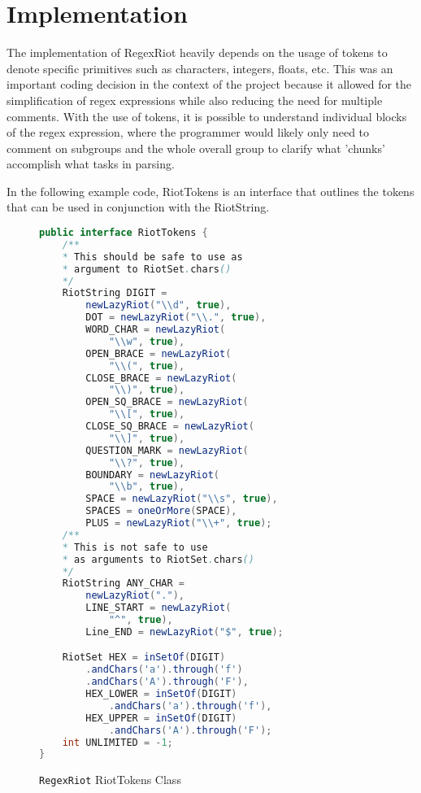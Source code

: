 \documentclass[conference]{IEEEtran}
\begin{document}
\section{Implementation}
The implementation of RegexRiot heavily depends on the usage of tokens to denote specific
primitives such as characters, integers, floats, etc. This was an important coding decision
in the context of the project because it allowed for the simplification of regex expressions
while also reducing the need for multiple comments. With the use of tokens, it is possible to
understand individual blocks of the regex expression, where the programmer would likely only
need to comment on subgroups and the whole overall group to clarify what 'chunks' accomplish
what tasks in parsing.

In the following example code, RiotTokens is an interface that outlines the tokens that can
be used in conjunction with the RiotString.

\begin{figure}[htbp]
    \centering
    \label{fig:regexriot-riot-tokens}
    \begin{lstlisting}[language=Java]
public interface RiotTokens {
    /**
    * This should be safe to use as 
    * argument to RiotSet.chars()
    */
    RiotString DIGIT = 
        newLazyRiot("\\d", true),
        DOT = newLazyRiot("\\.", true),
        WORD_CHAR = newLazyRiot(
            "\\w", true),
        OPEN_BRACE = newLazyRiot(
            "\\(", true),
        CLOSE_BRACE = newLazyRiot(
            "\\)", true),
        OPEN_SQ_BRACE = newLazyRiot(
            "\\[", true),
        CLOSE_SQ_BRACE = newLazyRiot(
            "\\]", true),
        QUESTION_MARK = newLazyRiot(
            "\\?", true),
        BOUNDARY = newLazyRiot(
            "\\b", true),
        SPACE = newLazyRiot("\\s", true),
        SPACES = oneOrMore(SPACE),
        PLUS = newLazyRiot("\\+", true);
    /**
    * This is not safe to use
    * as arguments to RiotSet.chars()
    */
    RiotString ANY_CHAR = 
        newLazyRiot("."),
        LINE_START = newLazyRiot(
            "^", true),
        Line_END = newLazyRiot("$", true);

    RiotSet HEX = inSetOf(DIGIT)
        .andChars('a').through('f')
        .andChars('A').through('F'),
        HEX_LOWER = inSetOf(DIGIT)
            .andChars('a').through('f'),
        HEX_UPPER = inSetOf(DIGIT)
            .andChars('A').through('F');
    int UNLIMITED = -1;
}
    \end{lstlisting}
    \caption{\texttt{RegexRiot} RiotTokens Class}
\end{figure}
\end{document}
